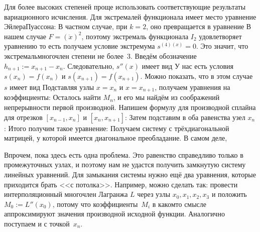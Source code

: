 \documentclass[a4paper]{article}
\begin{document}
Для более высоких степеней проще использовать соответствующие результаты
вариационного исчисления. Для экстремалей функционала
имеет место уравнение Эйлера\ч Пуассона:
В частном случае, при $k = 2$, оно превращается в уравнение
В нашем случае $F = (\ddot x)^2$, поэтому экстремаль функционала $I_2$ удовлетворяет уравнению
то есть получаем условие экстремума $s^{(4)(x)} = 0$. Это значит, что экстремаль\т многочлен степени не более~3.
Введём обозначение $h_{n+1} := x_{n+1} - x_n$.
Следовательно, $s''(x)$ имеет вид
У нас есть условия
$s(x_n) = f(x_n)$ и $s(x_{n+1}) = f(x_{n+1})$. Можно показать, что в этом случае $s$ имеет
вид
Подставляя узлы $x = x_n$ и $x = x_{n+1}$, получаем уравнения на коэффициенты:
Осталось найти $M_n$, и его мы найдём из соображений непрерывности первой производной.
Напишем формулу для производной сплайна для отрезков $[x_{n-1},x_n]$ и $[x_n,x_{n+1}]$:
Затем подставим в оба равенства узел $x_n$:
 Итого получим такое уравнение:
Получаем систему с трёхдиагональной матрицей, у которой имеется диагональное преобладание.
В самом деле,

Впрочем, пока здесь есть одна проблема. Это равенство справедливо только в промежуточных
узлах, и поэтому нам не удастся получить замкнутую систему линейных уравнений.
Для замыкания системы нужно ещё два уравнения, которые приходится брать <<с потолка>>.
Например, можно сделать так: провести интерполяционный многочлен Лагранжа $L$
через узлы $x_0, x_1, x_2,x_3$ и положить $M_0 := L''(x_0)$, потому что коэффициенты~$M_i$
в каком\д то смысле аппроксимируют значения производной исходной функции.
Аналогично поступаем и с точкой~$x_n$.
\end{document}
